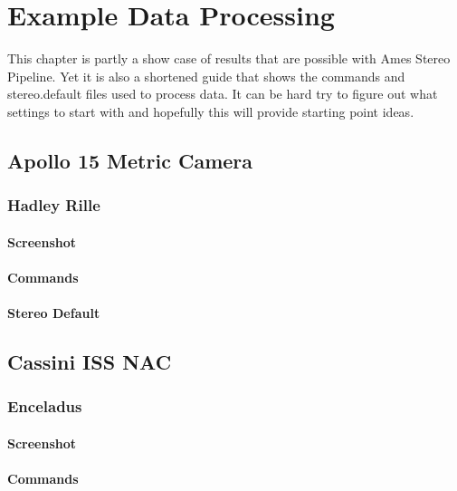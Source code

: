 \chapter{Example Data Processing}

This chapter is partly a show case of results that are possible with
Ames Stereo Pipeline. Yet it is also a shortened guide that shows the
commands and stereo.default files used to process data. It can be hard
try to figure out what settings to start with and hopefully this will
provide starting point ideas.

\section{Apollo 15 Metric Camera}

\subsection{Hadley Rille}

\subsubsection*{Screenshot}

\subsubsection*{Commands}

\subsubsection*{Stereo Default}

\section{Cassini ISS NAC}

\subsection{Enceladus}

\subsubsection*{Screenshot}

\subsubsection*{Commands}

